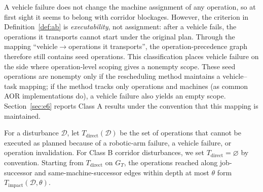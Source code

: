 \begin{remark}
\label{rem:agv_class}
A vehicle failure does not change the machine assignment of any operation, so at first sight it seems to belong with corridor blockages. However, the criterion in Definition~\ref{def:ab} is
\emph{executability}, not assignment: after a vehicle fails, the operations it transports cannot start under the original plan.
Through the mapping ``vehicle\(\to\)operations it transports'', the operation-precedence graph therefore still contains seed operations. This classification places vehicle failure
on the side where operation-level scoping gives a nonempty scope.
These seed operations are nonempty only if the rescheduling method maintains a vehicle--task mapping; if the method tracks only operations and machines
(as common AOR implementations do), a vehicle failure also yields an empty scope.
Section~\ref{sec:e6} reports Class A results under the convention that this mapping is maintained.
\end{remark}

\begin{definition}
\label{def:task_impact}
For a disturbance \(\mathcal{D}\), let \(T_{\mathrm{direct}}(\mathcal{D})\) be the set of operations that cannot be executed as planned because of a robotic-arm failure, a vehicle failure, or operation invalidation.
For Class B corridor disturbances, we set \(T_{\mathrm{direct}}=\varnothing\) by convention.
Starting from \(T_{\mathrm{direct}}\) on \(G_T\), the operations reached along job-successor and same-machine-successor edges within depth at most \(\theta\) form
\(T_{\mathrm{impact}}(\mathcal{D},\theta)\).
\end{definition}

